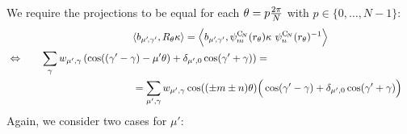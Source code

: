 \documentclass{article}
\newcommand{\lp}{\left(}
\newcommand{\rp}{\right)}
\newcommand{\CN}{\ensuremath{\operatorname{C}_{\!N}}}
\begin{document}
We require the projections to be equal for each $\theta=p{2\pi\over N}$ with $p\in\{0,\dots,N-1\}$:
\begin{align*}
    && \qquad\qquad\qquad\qquad\qquad \langle b_{\mu'\!,\gamma'},  R_{\theta} \kappa \rangle 
    & = \Big\langle b_{\mu'\!,\gamma'}, \psi_m^{\CN}(r_\theta)\kappa\ \psi_n^{\CN}(r_\theta)^{-1} \Big\rangle && \\
&\Leftrightarrow &\sum_{\gamma} w_{\mu', \gamma} \lp\cos((\gamma' - \gamma) -  \mu'\theta) + \delta_{\mu', 0}\cos(\gamma'+\gamma) \rp = \qquad\qquad\qquad\qquad\qquad\qquad \span&&\\
&& \span \qquad\qquad\qquad\qquad\qquad = \sum_{\mu', \gamma} w_{\mu', \gamma} \cos((\pm m \pm n) \theta) \Big( \cos(\gamma' -\gamma) + \delta_{\mu', 0}\cos(\gamma'+\gamma) \Big)&&
\end{align*}
Again, we consider two cases for $\mu'$:
\end{document}
